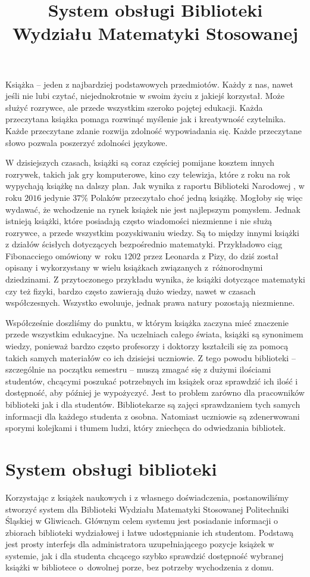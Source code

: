 \documentclass[twoside]{projektInzynierskiMS}
\title{System obsługi Biblioteki Wydziału Matematyki Stosowanej}
\begin{document}
Książka -- jeden z najbardziej podstawowych przedmiotów. Każdy z nas, nawet jeśli nie lubi czytać, niejednokrotnie w swoim życiu z jakiejś korzystał. Może służyć rozrywce, ale przede wszystkim szeroko pojętej edukacji. Każda przeczytana książka pomaga rozwinąć myślenie jak i kreatywność czytelnika. Każde przeczytane zdanie rozwija zdolność wypowiadania się. 
Każde przeczytane słowo pozwala poszerzyć zdolności językowe.

W dzisiejszych czasach, książki są coraz częściej pomijane kosztem innych rozrywek, takich jak gry komputerowe, kino czy telewizja, które z roku na rok wypychają książkę na dalszy plan. Jak wynika z raportu Biblioteki Narodowej \cite{raportBN}, w roku $2016$ jedynie $37\%$ Polaków przeczytało choć jedną książkę. Mogłoby się więc wydawać, że wchodzenie na rynek książek nie jest najlepszym pomysłem. Jednak istnieją książki, które posiadają często wiadomości niezmienne i nie służą rozrywce, a przede wszystkim pozyskiwaniu wiedzy. Są to między innymi książki z działów ścisłych dotyczących bezpośrednio matematyki. Przykładowo ciąg Fibonacciego omówiony w~roku $1202$ przez Leonarda z Pizy, do dziś został opisany i wykorzystany w wielu książkach związanych z~różnorodnymi dziedzinami. Z przytoczonego przykładu wynika, że książki dotyczące matematyki czy też fizyki, bardzo często zawierają dużo wiedzy, nawet w czasach współczesnych. Wszystko ewoluuje, jednak prawa natury pozostają niezmienne.

Współcześnie doszliśmy do punktu, w którym książka zaczyna mieć znaczenie przede wszystkim edukacyjne. Na uczelniach całego świata, książki są synonimem wiedzy, ponieważ bardzo często profesorzy i doktorzy kształcili się za pomocą takich samych materiałów co ich dzisiejsi uczniowie. Z tego powodu biblioteki -- szczególnie na początku semestru -- muszą zmagać się z dużymi ilościami studentów, chcącymi poszukać potrzebnych im książek oraz sprawdzić ich ilość i dostępność, aby później je wypożyczyć. Jest to problem zarówno dla pracowników biblioteki jak i dla studentów. Bibliotekarze są zajęci sprawdzaniem tych samych informacji dla każdego studenta z osobna. Natomiast uczniowie są zdenerwowani sporymi kolejkami i tłumem ludzi, który zniechęca do odwiedzania bibliotek.

\section{System obsługi biblioteki}

Korzystając z książek naukowych i z własnego doświadczenia, postanowiliśmy stworzyć system dla Biblioteki Wydziału Matematyki Stosowanej Politechniki Śląskiej w Gliwicach. Głównym celem systemu jest posiadanie informacji o zbiorach biblioteki wydziałowej i łatwe udostępnianie ich studentom. Podstawą jest prosty interfejs dla administratora uzupełniającego pozycje książek w systemie, jak i dla studenta chcącego szybko sprawdzić dostępność wybranej książki w bibliotece o~dowolnej porze, bez potrzeby wychodzenia z domu.
\end{document}
